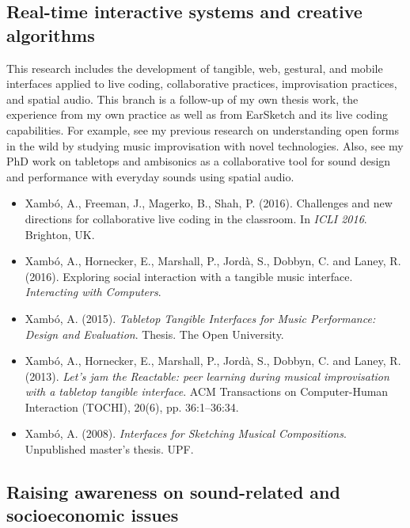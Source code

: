\documentclass[10pt, a4paper]{article}
\begin{document}
\subsection*{Real-time interactive systems and creative algorithms}

This research includes the development of tangible, web, gestural, and mobile interfaces applied to live coding, collaborative practices, improvisation practices, and spatial audio.
This branch is a follow-up of my own thesis work, the experience from my own practice as well as from EarSketch and its live coding capabilities. For example, see my previous research on understanding open forms in the wild by studying music improvisation with novel technologies. Also, see my PhD work on tabletops and ambisonics as a collaborative tool for sound design and performance with everyday sounds using spatial audio.\\

\begin{itemize}
\item Xambó, A., Freeman, J., Magerko, B., Shah, P. (2016). Challenges and new directions for collaborative live coding in the classroom. In \emph{ICLI 2016}. Brighton, UK.
\item Xambó, A., Hornecker, E., Marshall, P., Jordà, S., Dobbyn, C. and Laney, R. (2016). Exploring social interaction with a tangible music interface. \emph{Interacting with Computers}.
\item Xambó, A. (2015). \emph{Tabletop Tangible Interfaces for Music Performance: Design and Evaluation}. Thesis. The Open University.
\item Xambó, A., Hornecker, E., Marshall, P., Jordà, S., Dobbyn, C. and Laney, R. (2013). \emph{Let's jam the Reactable: peer learning during musical improvisation with a tabletop tangible interface}. ACM Transactions on Computer-Human Interaction (TOCHI), 20(6), pp. 36:1–36:34.
\item Xambó, A. (2008). \emph{Interfaces for Sketching Musical Compositions}. Unpublished master’s thesis. UPF.
\end{itemize}

\subsection*{Raising awareness on sound-related and socioeconomic issues}
\end{document}
